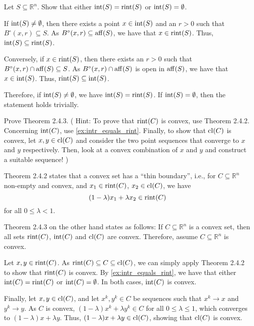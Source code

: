 \setcounter{exercise}{36}
\setcounter{solution}{36}

\begin{exercise}\label{ex:intr_equals_rint}
  Let $S \subseteq \mathbb{R}^n$.
  Show that either $\operatorname*{int}(S) = \operatorname*{rint}(S)$ or $\operatorname*{int}(S) = \emptyset$.
\end{exercise}

\begin{solution}
  If $\operatorname*{int}(S) \neq \emptyset$, then there exists a point $x \in \operatorname*{int}(S)$ and an $r > 0$ such that $B^\circ(x, r) \subseteq S$.
  As $B^\circ(x, r) \subseteq \operatorname*{aff}(S)$, we have that $x \in \operatorname*{rint}(S)$.
  Thus, $\operatorname*{int}(S) \subseteq \operatorname*{rint}(S)$.

  Conversely, if $x \in \operatorname*{rint}(S)$, then there exists an $r > 0$ such that $B^\circ(x, r) \cap \operatorname*{aff}(S) \subseteq S$.
  As $B^\circ(x, r) \cap \operatorname*{aff}(S)$ is open in $\operatorname*{aff}(S)$, we have that $x \in \operatorname*{int}(S)$.
  Thus, $\operatorname*{rint}(S) \subseteq \operatorname*{int}(S)$.

  Therefore, if $\operatorname*{int}(S) \neq \emptyset$, we have $\operatorname*{int}(S) = \operatorname*{rint}(S)$.
  If $\operatorname*{int}(S) = \emptyset$, then the statement holds trivially.
\end{solution}

\begin{exercise}
  Prove Theorem 2.4.3.
  (%
    Hint: To prove that $\operatorname*{rint}(C)$ is convex, use Theorem 2.4.2.
    Concerning $\operatorname*{int}(C)$, use \cref{ex:intr_equals_rint}.
    Finally, to show that $\operatorname*{cl}(C)$ is convex, let $x, y \in \operatorname*{cl}(C)$ and consider the two point sequences that converge to $x$ and $y$ respectively.
    Then, look at a convex combination of $x$ and $y$ and construct a suitable sequence!%
  )
\end{exercise}

\begin{solution}
  Theorem 2.4.2 states that a convex set has a ``thin boundary'', i.e., for $C \subseteq \mathbb{R}^n$ non-empty and convex, and $x_1 \in \operatorname*{rint}(C)$, $x_2 \in \operatorname*{cl}(C)$, we have
  \begin{equation}
    (1 - \lambda) x_1 + \lambda x_2 \in \operatorname*{rint}(C)
  \end{equation}
  for all $0 \leq \lambda < 1$.

  Theorem 2.4.3 on the other hand states as follows:
  If $C \subseteq \mathbb{R}^n$ is a convex set, then all sets $\operatorname*{rint}(C)$, $\operatorname*{int}(C)$ and $\operatorname*{cl}(C)$ are convex.
  Therefore, assume $C \subseteq \mathbb{R}^n$ is convex.

  Let $x, y \in \operatorname*{rint}(C)$.
  As $\operatorname*{rint}(C) \subseteq C \subseteq \operatorname*{cl}(C)$, we can simply apply Theorem 2.4.2 to show that $\operatorname*{rint}(C)$ is convex.
  By \cref{ex:intr_equals_rint}, we have that either $\operatorname*{int}(C) = \operatorname*{rint}(C)$ or $\operatorname*{int}(C) = \emptyset$.
  In both cases, $\operatorname*{int}(C)$ is convex.

  Finally, let $x, y \in \operatorname*{cl}(C)$,
  and let $x^k, y^k \in C$ be sequences such that $x^k \to x$ and $y^k \to y$.
  As $C$ is convex, $(1 - \lambda) x^k + \lambda y^k \in C$ for all $0 \leq \lambda \leq 1$, which converges to $(1 - \lambda) x + \lambda y$.
  Thus, $(1 - \lambda) x + \lambda y \in \operatorname*{cl}(C)$, showing that $\operatorname*{cl}(C)$ is convex.
\end{solution}